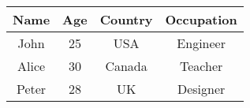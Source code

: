 \documentclass[10pt]{article}
\begin{document}
\begin{table}[htbp]
\centering
\label{tab:example}
\begin{tabular}{|c|c|c|c|}
\hline
Name & Age & Country & Occupation  \\
\hline
John & 25 & USA & Engineer  \\
\hline
Alice & 30 & Canada & Teacher  \\
\hline
Peter & 28 & UK & Designer  \\
\hline
\end{tabular}
\end{table}
\end{document}
